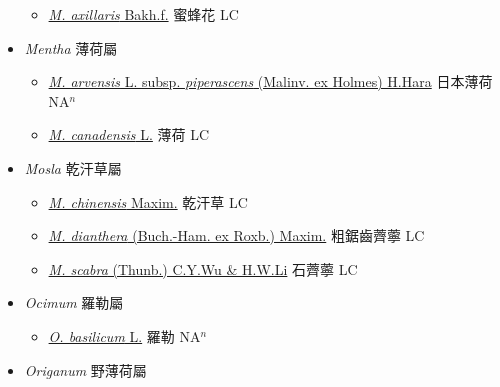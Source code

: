 \begin{itemize}
  \begin{itemize}
        \item[] \href{http://www.theplantlist.org/tpl1.1/search?q=Melissa+axillaris}{\textit{M. axillaris} Bakh.f.}   蜜蜂花 LC
  \end{itemize}
 \item[] \textit{Mentha} 薄荷屬
                    
  \begin{itemize}
        \item[] \href{http://www.theplantlist.org/tpl1.1/search?q=Mentha+arvensis+subsp.+piperascens}{\textit{M. arvensis} L. subsp. \textit{piperascens} (Malinv. ex Holmes) H.Hara}   日本薄荷 NA$^n$
        \item[] \href{http://www.theplantlist.org/tpl1.1/search?q=Mentha+canadensis}{\textit{M. canadensis} L.}   薄荷 LC
  \end{itemize}
 \item[] \textit{Mosla} 乾汗草屬
                    
  \begin{itemize}
        \item[] \href{http://www.theplantlist.org/tpl1.1/search?q=Mosla+chinensis}{\textit{M. chinensis} Maxim.}   乾汗草 LC
        \item[] \href{http://www.theplantlist.org/tpl1.1/search?q=Mosla+dianthera}{\textit{M. dianthera} (Buch.-Ham. ex Roxb.) Maxim.}   粗鋸齒薺薴 LC
        \item[] \href{http://www.theplantlist.org/tpl1.1/search?q=Mosla+scabra}{\textit{M. scabra} (Thunb.) C.Y.Wu \& H.W.Li}   石薺薴 LC
  \end{itemize}
 \item[] \textit{Ocimum} 羅勒屬
                    
  \begin{itemize}
        \item[] \href{http://www.theplantlist.org/tpl1.1/search?q=Ocimum+basilicum}{\textit{O. basilicum} L.}   羅勒 NA$^n$
  \end{itemize}
 \item[] \textit{Origanum} 野薄荷屬
                    

\end{itemize}
